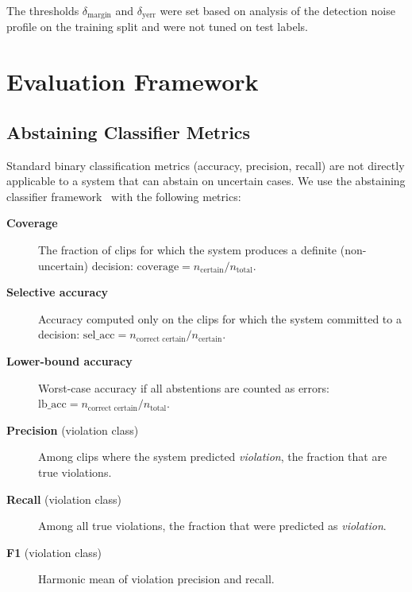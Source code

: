\documentclass[12pt,a4paper,twoside]{article}
\begin{document}
The thresholds $\delta_{\text{margin}}$ and $\delta_{\text{yerr}}$ were
set based on analysis of the detection noise profile on the training split
and were not tuned on test labels.


\section{Evaluation Framework}
\label{sec:eval}

\subsection{Abstaining Classifier Metrics}

Standard binary classification metrics (accuracy, precision, recall) are
not directly applicable to a system that can abstain on uncertain cases.
We use the abstaining classifier framework~\cite{geifman2017selective} with
the following metrics:

\begin{description}
  \item[\textbf{Coverage}] The fraction of clips for which the system produces
        a definite (non-uncertain) decision:
        $\text{coverage} = n_{\text{certain}} / n_{\text{total}}$.

  \item[\textbf{Selective accuracy}] Accuracy computed only on the clips for
        which the system committed to a decision:
        $\text{sel\_acc} = n_{\text{correct certain}} / n_{\text{certain}}$.

  \item[\textbf{Lower-bound accuracy}] Worst-case accuracy if all abstentions
        are counted as errors:
        $\text{lb\_acc} = n_{\text{correct certain}} / n_{\text{total}}$.

  \item[\textbf{Precision} (violation class)] Among clips where the system
        predicted \textit{violation}, the fraction that are true violations.

  \item[\textbf{Recall} (violation class)] Among all true violations, the
        fraction that were predicted as \textit{violation}.

  \item[\textbf{F1} (violation class)] Harmonic mean of violation precision
        and recall.
\end{description}
\end{document}
